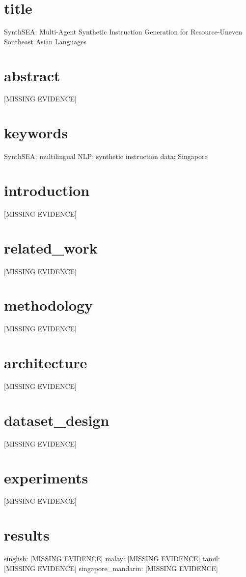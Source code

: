 \section{title}
SynthSEA: Multi-Agent Synthetic Instruction Generation for Resource-Uneven Southeast Asian Languages

\section{abstract}
[MISSING EVIDENCE]

\section{keywords}
SynthSEA; multilingual NLP; synthetic instruction data; Singapore

\section{introduction}
[MISSING EVIDENCE]

\section{related_work}
[MISSING EVIDENCE]

\section{methodology}
[MISSING EVIDENCE]

\section{architecture}
[MISSING EVIDENCE]

\section{dataset_design}
[MISSING EVIDENCE]

\section{experiments}
[MISSING EVIDENCE]

\section{results}
singlish: [MISSING EVIDENCE]
malay: [MISSING EVIDENCE]
tamil: [MISSING EVIDENCE]
singapore_mandarin: [MISSING EVIDENCE]

